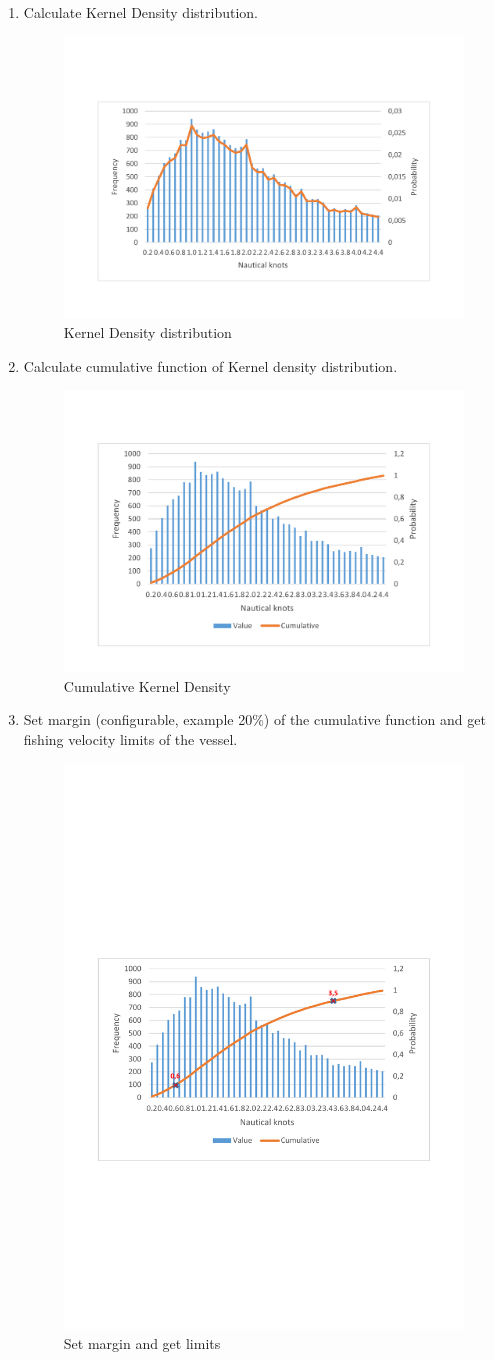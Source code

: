 \begin{enumerate}

\newpage
\item Calculate Kernel Density distribution.
\begin{figure}[H]
    \centering
    \includegraphics[trim=0 80 0 80,height=0.45\linewidth]{Chapters/img/hist_kernel.pdf}
    \caption{Kernel Density distribution}
    \label{fig:app_b_6}
\end{figure}

\item Calculate cumulative function of Kernel density distribution.
\begin{figure}[H]
    \centering
    \includegraphics[trim=0 80 0 80,height=0.45\linewidth]{Chapters/img/hist_comulative.pdf}
    \caption{Cumulative Kernel Density}
    \label{fig:app_b_7}
\end{figure}
\newpage %
\item Set margin (configurable, example 20\%) of the cumulative function and get fishing velocity limits of the vessel.
\begin{figure}[H]
    \centering
    \includegraphics[trim=300 250 300 300,height=0.5\linewidth]{Chapters/img/hc_8.pdf}
    \caption{Set margin and get limits}
    \label{fig:app_b_8}
\end{figure}


\end{enumerate}
